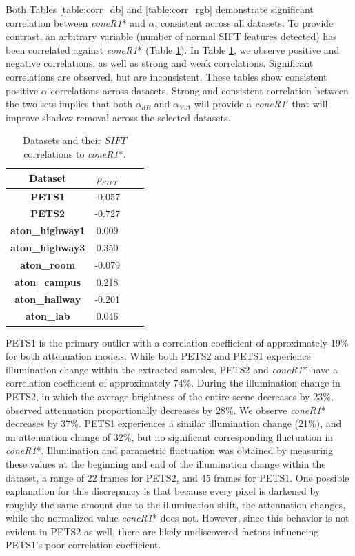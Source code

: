 Both Tables \ref{table:corr_db} and \ref{table:corr_rgb} demonstrate significant correlation between \textit{coneR1}* and $\alpha$, consistent across all datasets. To provide contrast, an arbitrary variable (number of normal SIFT features detected) has been correlated against \textit{coneR1}* (Table \ref{table:bad_corr}). In Table \ref{table:bad_corr}, we observe positive and negative correlations, as well as strong and weak correlations.  Significant correlations are observed, but are inconsistent. These tables show consistent positive $\alpha$ correlations across datasets. Strong and consistent correlation between the two sets implies that both $\alpha_{dB}$ and $\alpha_{\%\Delta}$ will provide a \textit{coneR1}$'$ that will improve shadow removal across the selected datasets.

\begin{table}
\centering
\begin{tabular}{ |c|c|c|c| }
	\hline
	\textbf{Dataset} & \textbf{$\rho_{SIFT}$} \\
	\hline
	\hline
	\textbf{PETS1} & -0.057 \\
	\hline
	\textbf{PETS2} & -0.727 \\
	\hline
	\textbf{aton\_highway1} & 0.009 \\
	\hline
	\textbf{aton\_highway3} & 0.350 \\
	\hline
	\textbf{aton\_room} & -0.079 \\
	\hline
	\textbf{aton\_campus} & 0.218 \\
	\hline
	\textbf{aton\_hallway} & -0.201 \\
	\hline
	\textbf{aton\_lab} & 0.046 \\
	\hline
\end{tabular}
\caption{Datasets and their $SIFT$ correlations to \textit{coneR1}*.}
\label{table:bad_corr}
\end{table}

PETS1 is the primary outlier with a correlation coefficient of approximately 19\% for both attenuation models. While both PETS2 and PETS1 experience illumination change within the extracted samples, PETS2 and \textit{coneR1}* have a correlation coefficient of approximately 74\%. During the illumination change in PETS2, in which the average brightness of the entire scene decreases by 23\%, observed attenuation proportionally decreases by 28\%. We observe \textit{coneR1}* decreases by 37\%. PETS1 experiences a similar illumination change (21\%), and an attenuation change of 32\%, but no significant corresponding fluctuation in \textit{coneR1}*. Illumination and parametric fluctuation was obtained by measuring these values at the beginning and end of the illumination change within the dataset, a range of 22 frames for PETS2, and 45 frames for PETS1. One possible explanation for this discrepancy is that because every pixel is darkened by roughly the same amount due to the illumination shift, the attenuation changes, while the normalized value \textit{coneR1}* does not. However, since this behavior is not evident in PETS2 as well, there are likely undiscovered factors influencing PETS1's poor correlation coefficient.

